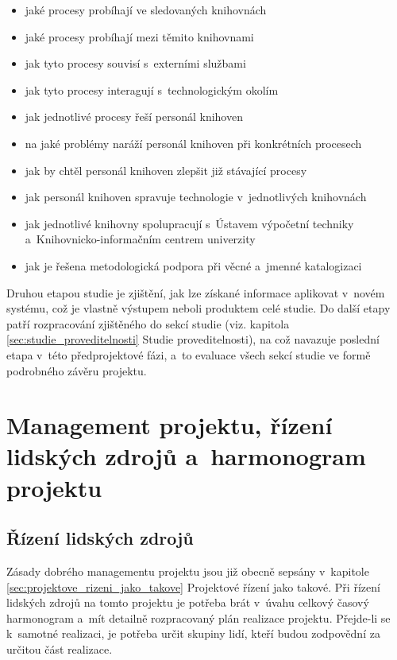 \documentclass[
	11pt, oneside, printed, final, palatino, monochrome
	microtype,
	table,   %
	lof,     %
	lot     %
]{fithesis3}
\begin{document}
{\begin{itemize}
\item jaké procesy probíhají ve sledovaných knihovnách
\item jaké procesy probíhají mezi těmito knihovnami
\item jak tyto procesy souvisí s~externími službami
\item jak tyto procesy interagují s~technologickým okolím
\item jak jednotlivé procesy řeší personál knihoven
\item na jaké problémy naráží personál knihoven při konkrétních procesech
\item jak by chtěl personál knihoven zlepšit již stávající procesy
\item jak personál knihoven spravuje technologie v~jednotlivých knihovnách
\item jak jednotlivé knihovny spolupracují s~Ústavem výpočetní techniky a~Knihovnicko-informačním centrem univerzity
\item jak je řešena metodologická podpora při věcné a~jmenné katalogizaci
\end{itemize}

Druhou etapou studie je zjištění, jak lze získané informace aplikovat v~novém systému, což je vlastně výstupem neboli produktem celé studie. Do další etapy patří rozpracování zjištěného do sekcí studie (viz. kapitola \ref{sec:studie_proveditelnosti} Studie proveditelnosti), na což navazuje poslední etapa v~této předprojektové fázi, a~to evaluace všech sekcí studie ve formě podrobného závěru projektu.

\section{Management projektu, řízení lidských zdrojů a~harmonogram projektu}

\subsection{Řízení lidských zdrojů}

Zásady dobrého managementu projektu jsou již obecně sepsány v~kapitole \ref{sec:projektove_rizeni_jako_takove} Projektové řízení jako takové. Při řízení lidských zdrojů na tomto projektu je potřeba brát v~úvahu celkový časový harmonogram a~mít detailně rozpracovaný plán realizace projektu. Přejde-li se k~samotné realizaci, je potřeba určit skupiny lidí, kteří budou zodpovědní za určitou část realizace.

}
\end{document}
